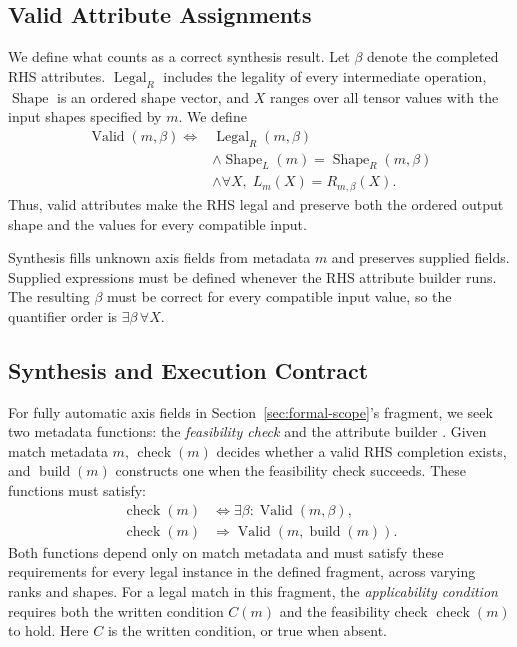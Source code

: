 \subsection{Valid Attribute Assignments}
\label{sec:valid}
We define what counts as a correct synthesis result.
Let $\beta$ denote the completed RHS attributes.
$\operatorname{Legal}_R$ includes the legality of every intermediate
operation, $\operatorname{Shape}$ is an ordered shape vector, and $X$ ranges
over all tensor values with the input shapes specified by $m$. We define
\begin{equation}
\begin{aligned}
 \operatorname{Valid}(m,\beta)\iff{}&
 \operatorname{Legal}_R(m,\beta)\\
 &\land\operatorname{Shape}_L(m)=\operatorname{Shape}_R(m,\beta)\\
 &\land\forall X,\; L_m(X)=R_{m,\beta}(X).
\end{aligned}
\label{eq:valid}
\end{equation}
Thus, valid attributes make the RHS legal and preserve both the ordered
output shape and the values for every compatible input.

Synthesis fills unknown axis fields from metadata $m$ and preserves supplied
fields. Supplied expressions must be defined whenever the RHS attribute
builder runs.
The resulting $\beta$ must be correct for every compatible input value,
so the quantifier order is $\exists\beta\,\forall X$.

\subsection{Synthesis and Execution Contract}
\label{sec:find}
For fully automatic axis fields in Section~\ref{sec:formal-scope}'s fragment,
we seek two metadata functions: the \emph{feasibility check}
 and the attribute builder . Given match metadata
$m$, $\operatorname{check}(m)$ decides whether a valid RHS completion
exists, and $\operatorname{build}(m)$ constructs one when the feasibility
check succeeds. These functions must satisfy:
\begin{align}
 \operatorname{check}(m)&\iff\exists\beta:\operatorname{Valid}(m,\beta),
 \label{eq:check-goal}\\
 \operatorname{check}(m)&\Rightarrow
 \operatorname{Valid}(m,\operatorname{build}(m)).
 \label{eq:build-goal}
\end{align}
Both functions depend only on match metadata and must satisfy these
requirements for every legal instance in the defined fragment, across
varying ranks and shapes.
For a legal match in this fragment, the \emph{applicability condition}
requires both the written condition $C(m)$ and the feasibility check
$\operatorname{check}(m)$ to hold. Here $C$ is the written 
condition, or true when absent.

